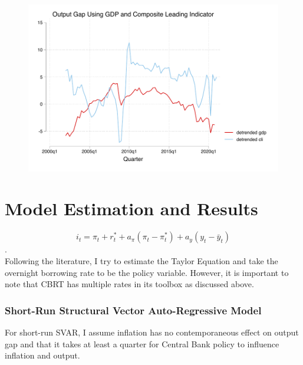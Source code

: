 \documentclass{article}
\begin{document}
    \begin{figure}[H]
        \centering
        \includegraphics[width=\linewidth-1cm]{turkey_taylor/output_gap.pdf}
    \end{figure}
\section{Model Estimation and Results}

    $$i_{t}=\pi_{t}+r_{t}^{*}+a_{\pi}\left(\pi_{t}-\pi_{t}^{*}\right)+a_{y}\left(y_{t}-\bar{y}_{t}\right)$$
    {\tiny .}\\
    Following the literature, I try to estimate the Taylor Equation and take the overnight borrowing rate to be the policy variable. However, it is important to note that CBRT has multiple rates in its toolbox as discussed above.
    
\subsubsection{Short-Run Structural Vector Auto-Regressive Model}

    For short-run SVAR, I assume inflation has no contemporaneous effect on output gap and that it takes at least a quarter for Central Bank policy to influence inflation and output. 
    
\end{document}
